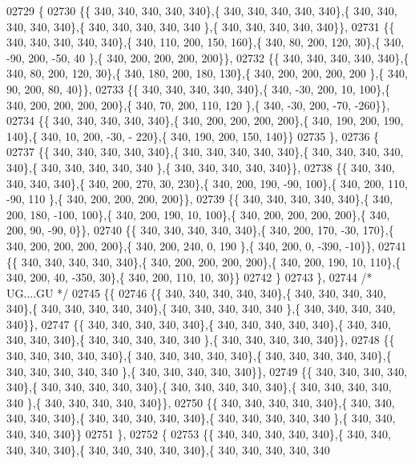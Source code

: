 \begin{DoxyCode}
02729 \{
02730 \{\{ 340, 340, 340, 340, 340\},\{ 340, 340, 340, 340, 340\},\{ 340, 340, 340, 340, 340\},\{ 340, 340, 340, 340, 340
      \},\{ 340, 340, 340, 340, 340\}\},
02731 \{\{ 340, 340, 340, 340, 340\},\{ 340, 110, 200, 150, 160\},\{ 340,  80, 200, 120,  30\},\{ 340, -90, 200, -50,  40
      \},\{ 340, 200, 200, 200, 200\}\},
02732 \{\{ 340, 340, 340, 340, 340\},\{ 340,  80, 200, 120,  30\},\{ 340, 180, 200, 180, 130\},\{ 340, 200, 200, 200, 200
      \},\{ 340,  90, 200,  80,  40\}\},
02733 \{\{ 340, 340, 340, 340, 340\},\{ 340, -30, 200,  10, 100\},\{ 340, 200, 200, 200, 200\},\{ 340,  70, 200, 110, 120
      \},\{ 340, -30, 200, -70, -260\}\},
02734 \{\{ 340, 340, 340, 340, 340\},\{ 340, 200, 200, 200, 200\},\{ 340, 190, 200, 190, 140\},\{ 340,  10, 200, -30, -
      220\},\{ 340, 190, 200, 150, 140\}\}
02735 \},
02736 \{
02737 \{\{ 340, 340, 340, 340, 340\},\{ 340, 340, 340, 340, 340\},\{ 340, 340, 340, 340, 340\},\{ 340, 340, 340, 340, 340
      \},\{ 340, 340, 340, 340, 340\}\},
02738 \{\{ 340, 340, 340, 340, 340\},\{ 340, 200, 270,  30, 230\},\{ 340, 200, 190, -90, 100\},\{ 340, 200, 110, -90, 110
      \},\{ 340, 200, 200, 200, 200\}\},
02739 \{\{ 340, 340, 340, 340, 340\},\{ 340, 200, 180, -100, 100\},\{ 340, 200, 190,  10, 100\},\{ 340, 200, 200, 200, 
      200\},\{ 340, 200,  90, -90,   0\}\},
02740 \{\{ 340, 340, 340, 340, 340\},\{ 340, 200, 170, -30, 170\},\{ 340, 200, 200, 200, 200\},\{ 340, 200, 240,   0, 190
      \},\{ 340, 200,   0, -390, -10\}\},
02741 \{\{ 340, 340, 340, 340, 340\},\{ 340, 200, 200, 200, 200\},\{ 340, 200, 190,  10, 110\},\{ 340, 200,  40, -350,  
      30\},\{ 340, 200, 110,  10,  30\}\}
02742 \}
02743 \},
02744 \textcolor{comment}{/* UG....GU */}
02745 \{\{
02746 \{\{ 340, 340, 340, 340, 340\},\{ 340, 340, 340, 340, 340\},\{ 340, 340, 340, 340, 340\},\{ 340, 340, 340, 340, 340
      \},\{ 340, 340, 340, 340, 340\}\},
02747 \{\{ 340, 340, 340, 340, 340\},\{ 340, 340, 340, 340, 340\},\{ 340, 340, 340, 340, 340\},\{ 340, 340, 340, 340, 340
      \},\{ 340, 340, 340, 340, 340\}\},
02748 \{\{ 340, 340, 340, 340, 340\},\{ 340, 340, 340, 340, 340\},\{ 340, 340, 340, 340, 340\},\{ 340, 340, 340, 340, 340
      \},\{ 340, 340, 340, 340, 340\}\},
02749 \{\{ 340, 340, 340, 340, 340\},\{ 340, 340, 340, 340, 340\},\{ 340, 340, 340, 340, 340\},\{ 340, 340, 340, 340, 340
      \},\{ 340, 340, 340, 340, 340\}\},
02750 \{\{ 340, 340, 340, 340, 340\},\{ 340, 340, 340, 340, 340\},\{ 340, 340, 340, 340, 340\},\{ 340, 340, 340, 340, 340
      \},\{ 340, 340, 340, 340, 340\}\}
02751 \},
02752 \{
02753 \{\{ 340, 340, 340, 340, 340\},\{ 340, 340, 340, 340, 340\},\{ 340, 340, 340, 340, 340\},\{ 340, 340, 340, 340, 340

\end{DoxyCode}
